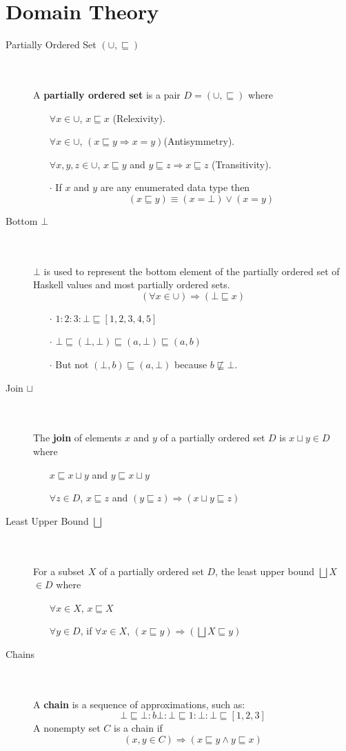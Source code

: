 \documentclass[12pt]{article}
\newcommand{\imp}{\textbf}
\newcommand{\state}[1]{\item[#1] \textcolor{white}{.} \\ \textcolor{white}{.} \\ }
\newcommand{\sse}{\sqsubseteq}
\newcommand{\point}[1]{\begin{itemize} \item[$\cdot$] #1 \end{itemize}}
\begin{document}
 
\section*{Domain Theory}

\begin{description}

\state{Partially Ordered Set $(\cup,\sse)$}
A \imp{partially ordered set} is a pair $D = (\cup, \sqsubseteq)$ where
\begin{itemize}
\item[] $\forall x \in \cup$, $x \sse x$ (Relexivity).
\item[] $\forall x \in \cup$,  $(x \sse y \Rightarrow x=y)$(Antisymmetry).
\item[] $\forall x,y,z \in \cup$, $x \sse y$ and $y \sse z \Rightarrow x \sse z$ (Transitivity).
\end{itemize}

\point{If $x$ and $y$ are any enumerated data type then $$ (x\sse y) \equiv (x=\bot) \vee (x=y) $$ }

\state{Bottom $\bot$}
$\bot$ is used to represent the bottom element of the partially ordered set of Haskell values and most partially ordered sets.
$$( \forall x \in \cup) \Rightarrow (\bot \sse x)$$

\point{$1:2:3:\bot \sse [1,2,3,4,5] $}
\point{$\bot \sse (\bot,\bot) \sse (a,\bot) \sse (a,b) $}
\point {But not $(\bot,b) \sse (a,\bot)$ because $b \not\sse \bot$.}

\state{Join $\sqcup$}
The \imp{join} of elements $x$ and $y$ of a partially ordered set $D$ is $x \sqcup y \in D$ where

\begin{itemize}
\item[] $x \sse x \sqcup y$ and $y \sse x \sqcup y$ 
\item[] $\forall z \in D$, $x \sse z$ and $(y \sse z) \Rightarrow (x \sqcup y \sse z)$
\end{itemize}

\state{Least Upper Bound $\bigsqcup$}
For a subset $X$ of a partially ordered set $D$, the least upper bound $\bigsqcup X$ $\in D$ where
\begin{itemize}
\item[] $\forall x \in X$, $x \sse X$
\item[]  $\forall y \in D$, if $\forall x \in X$, $(x \sse y) \Rightarrow \left( \bigsqcup X \sse y \right)$
\end{itemize}

\state{Chains}
A \imp{chain} is a sequence of approximations, such as:
$$\bot \sse \bot : b\bot : \bot \sse 1 : \bot : \bot \sse [1,2,3] $$
A nonempty set $C$ is a chain if
$$ (x,y \in C) \Rightarrow \left(  x\sse y \wedge y\sse x \right)$$


\end{description}
\end{document}
